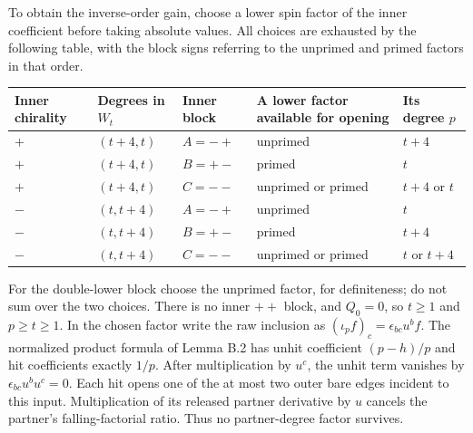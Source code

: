\documentclass[
  english,
  11pt,
  reqno]{amsart}
\newcounter{none} %
\begin{document}
To obtain the inverse-order gain, choose a lower spin factor of the
inner coefficient before taking absolute values. All choices are
exhausted by the following table, with the block signs referring to the
unprimed and primed factors in that order.

{\def\LTcaptype{none} %
\begin{longtable}[]{@{}
  >{\raggedright\arraybackslash}p{}
  >{\raggedright\arraybackslash}p{}
  >{\raggedright\arraybackslash}p{}
  >{\raggedright\arraybackslash}p{}
  >{\raggedright\arraybackslash}p{}@{}}
\toprule\noalign{}
\begin{minipage}[b]{\linewidth}\raggedright
Inner chirality
\end{minipage} & \begin{minipage}[b]{\linewidth}\raggedright
Degrees in \(W_t\)
\end{minipage} & \begin{minipage}[b]{\linewidth}\raggedright
Inner block
\end{minipage} & \begin{minipage}[b]{\linewidth}\raggedright
A lower factor available for opening
\end{minipage} & \begin{minipage}[b]{\linewidth}\raggedright
Its degree \(p\)
\end{minipage} \\
\midrule\noalign{}
\endhead
\bottomrule\noalign{}
\endlastfoot
\(+\) & \((t+4,t)\) & \(A=-+\) & unprimed & \(t+4\) \\
\(+\) & \((t+4,t)\) & \(B=+-\) & primed & \(t\) \\
\(+\) & \((t+4,t)\) & \(C=--\) & unprimed or primed & \(t+4\) or
\(t\) \\
\(-\) & \((t,t+4)\) & \(A=-+\) & unprimed & \(t\) \\
\(-\) & \((t,t+4)\) & \(B=+-\) & primed & \(t+4\) \\
\(-\) & \((t,t+4)\) & \(C=--\) & unprimed or primed & \(t\) or
\(t+4\) \\
\end{longtable}
}

For the double-lower block choose the unprimed factor, for definiteness;
do not sum over the two choices. There is no inner \(++\) block, and
\(Q_0=0\), so \(t\ge1\) and \(p\ge t\ge1\). In the chosen factor write
the raw inclusion as \((\iota_pf)_c=\epsilon_{bc}u^bf\). The normalized
product formula of Lemma B.2 has unhit coefficient \((p-h)/p\) and hit
coefficients exactly \(1/p\). After multiplication by \(u^c\), the unhit
term vanishes by \(\epsilon_{bc}u^bu^c=0\). Each hit opens one of the at
most two outer bare edges incident to this input. Multiplication of its
released partner derivative by \(u\) cancels the partner's
falling-factorial ratio. Thus no partner-degree factor survives.
\end{document}
